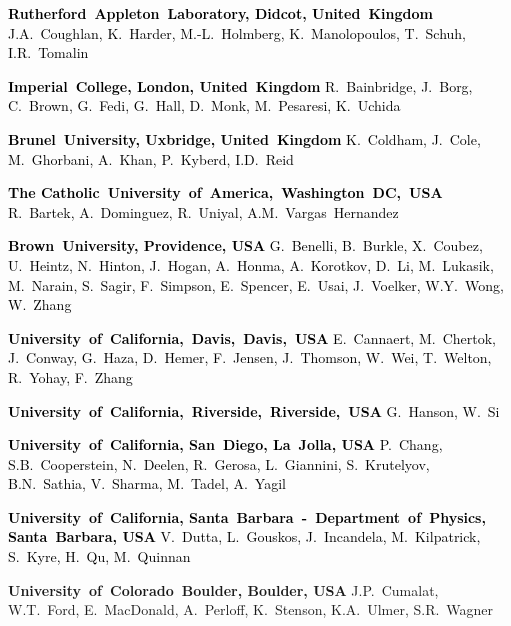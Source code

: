 \textcolor{black}{\textbf{Rutherford~Appleton~Laboratory, Didcot, United~Kingdom}\newline
J.A.~Coughlan, K.~Harder, M.-L.~Holmberg, K.~Manolopoulos, T.~Schuh, I.R.~Tomalin}

\textcolor{black}{\textbf{Imperial~College, London, United~Kingdom}\newline
R.~Bainbridge, J.~Borg, C.~Brown, G.~Fedi, G.~Hall, D.~Monk, M.~Pesaresi, K.~Uchida}

\textcolor{black}{\textbf{Brunel~University, Uxbridge, United~Kingdom}\newline
K.~Coldham, J.~Cole, M.~Ghorbani, A.~Khan, P.~Kyberd, I.D.~Reid}

\textcolor{black}{\textbf{The Catholic~University~of~America,~Washington~DC,~USA}\newline
R.~Bartek, A.~Dominguez, R.~Uniyal, A.M.~Vargas~Hernandez}

\textcolor{black}{\textbf{Brown~University, Providence, USA}\newline
G.~Benelli, B.~Burkle, X.~Coubez, U.~Heintz, N.~Hinton, J.~Hogan, A.~Honma, A.~Korotkov, D.~Li, M.~Lukasik, M.~Narain, S.~Sagir,  F.~Simpson, E.~Spencer, E.~Usai, J.~Voelker, W.Y.~Wong, W.~Zhang}

\textcolor{black}{\textbf{University~of~California,~Davis,~Davis,~USA}\newline
E.~Cannaert, M.~Chertok, J.~Conway, G.~Haza, D.~Hemer, F.~Jensen, J.~Thomson, W.~Wei, T.~Welton, R.~Yohay, F.~Zhang}

\textcolor{black}{\textbf{University~of~California,~Riverside,~Riverside,~USA}\newline
G.~Hanson, W.~Si}

\textcolor{black}{\textbf{University~of~California, San~Diego, La~Jolla, USA}\newline
P.~Chang, S.B.~Cooperstein, N.~Deelen, R.~Gerosa, L.~Giannini, S.~Krutelyov, B.N.~Sathia, V.~Sharma, M.~Tadel, A.~Yagil}

\textcolor{black}{\textbf{University~of~California, Santa~Barbara~-~Department~of~Physics, Santa~Barbara, USA}\newline
V.~Dutta, L.~Gouskos, J.~Incandela, M.~Kilpatrick, S.~Kyre, H.~Qu, M.~Quinnan}

\textbf{University~of~Colorado~Boulder, Boulder, USA}\newline
J.P.~Cumalat, W.T.~Ford, E.~MacDonald, A.~Perloff, K.~Stenson, K.A.~Ulmer, S.R.~Wagner


